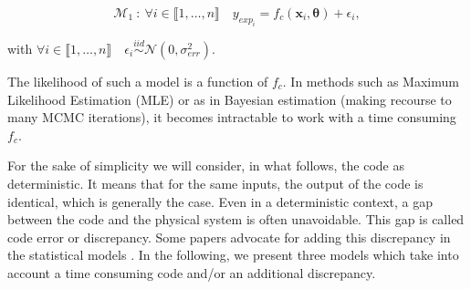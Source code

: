 \documentclass[soumission]{jsfds}
\newcommand{\prior}{\textit{prior }}
\begin{document}
\begin{equation}
\mathcal{M}_1\ : \ \forall i \in \llbracket1,\dots,n\rrbracket \quad  y_{exp_i}=f_c(\boldsymbol{x}_i,\boldsymbol{\theta})+\epsilon_i,
\label{eq:model1}
\end{equation}

with $\forall i \in \llbracket1,\dots,n\rrbracket \quad \epsilon_i\overset{iid}{\sim}\mathcal{N}(0,\sigma_{err}^2)$.\newline


%

The likelihood of such a model is a function of $f_c$. In methods such as Maximum Likelihood Estimation (MLE) or as in Bayesian estimation (making recourse to many MCMC iterations), it becomes intractable to work with a time consuming $f_c$.\newline

For the sake of simplicity we will consider, in what follows, the code as deterministic. It means that for the same inputs, the output of the code is identical, which is generally the case. Even in a deterministic context, a gap between the code and the physical system is often unavoidable. This gap is called code error or discrepancy. Some papers advocate for adding this discrepancy in the statistical models \citep{kennedy2001,higdon2004,bayarri2007,bachoc2014}. In the following, we present three models which take into account a time consuming code and/or an additional discrepancy.
\newline

%
\end{document}
